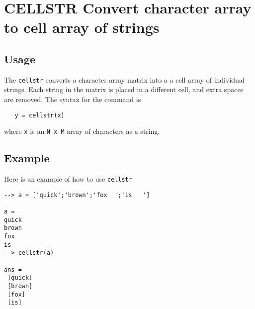 \section{CELLSTR Convert character array to cell array of strings}

\subsection{Usage}

The \verb|cellstr| converts a character array matrix into a 
a cell array of individual strings.  Each string in
the matrix is placed in a different cell, and extra spaces
are removed.  The syntax for the command is
\begin{verbatim}
   y = cellstr(x)
\end{verbatim}
where \verb|x| is an \verb|N x M| array of characters as a string.
\subsection{Example}

Here is an example of how to use \verb|cellstr|
\begin{verbatim}
--> a = ['quick';'brown';'fox  ';'is   ']

a = 
quick
brown
fox  
is   
--> cellstr(a)

ans = 
 [quick] 
 [brown] 
 [fox] 
 [is] 
\end{verbatim}
